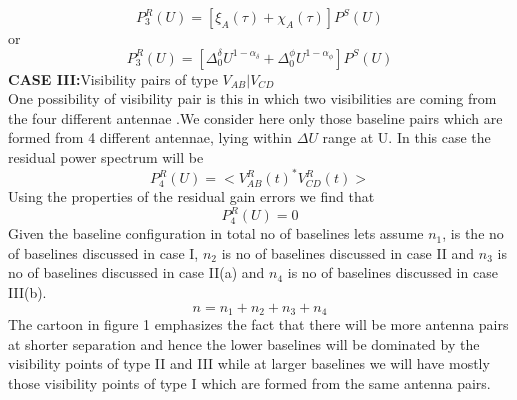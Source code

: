 \documentclass[fleqn,usenatbib]{mnras}
\begin{document}
\begin{equation}
    P_3^R(U) = [\xi_A({\tau}) + \chi_A(\tau)]P^S(U)
\end{equation}
or
\begin{equation}
      P_3^R(U) = [\Delta^{\delta}_0  U^{1-\alpha_{\delta}}+ \Delta^{\phi}_0 U^{1-\alpha_{\phi}}]P^S(U)
 \end{equation}
\textbf{CASE III:}{Visibility pairs of type $V_{AB}|V_{CD}$}\\
One possibility of visibility pair is this in which two visibilities are coming from the four different antennae .We consider here only those baseline pairs which are formed from 4 different antennae, lying within $\Delta U$ range at U. In this case the residual power spectrum will be
\begin{equation}
    P_4^R(U) = <V^R_{AB}(t)^* V^R_{CD}(t)>
\end{equation}
Using the properties of the residual gain errors we find that
\begin{equation}
    P_4^R(U) = 0
\end{equation}
Given the baseline configuration in total no of baselines lets assume $n_1$, is the no of baselines discussed in case I, $n_2$ is no of baselines discussed in case II and $n_3$ is no of baselines discussed in case II(a) and $n_4$ is no of baselines discussed in case III(b).
\begin{equation}
    n = n_1 + n_2 + n_3 + n_4
\end{equation}
The cartoon in figure 1 emphasizes the fact that there will be more antenna pairs at shorter separation and hence the lower baselines will be dominated by the visibility points of type II and III while at larger baselines we will have mostly those visibility points of type I which are formed from the same antenna pairs.\\
\end{document}
